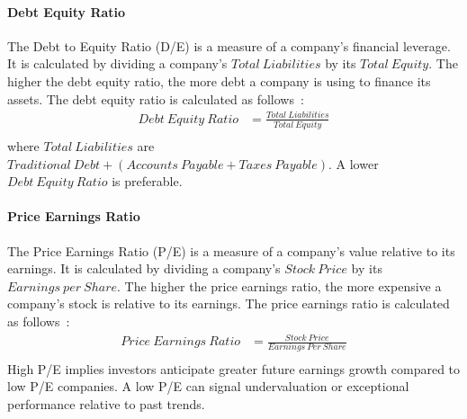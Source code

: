 \documentclass[../xlapes02]{subfiles}
\begin{document}
    \paragraph{Debt Equity Ratio}\label{par:debt-equity-ratio}
    The Debt to Equity Ratio (D/E) is a measure of a company's financial leverage. It is calculated by dividing a company's $Total\ Liabilities$ by its $Total\ Equity$. The higher the debt equity ratio, the more debt a company is using to finance its assets. The debt equity ratio is calculated as follows~\cite{investopedia}:
    \begin{equation}
        \begin{split}
            Debt\ Equity\ Ratio&=\frac{Total\ Liabilities}{Total\ Equity}\\
        \end{split}
    \end{equation}
    where $Total\ Liabilities$ are $Traditional\ Debt+(Accounts\ Payable+Taxes\ Payable)$. A lower $Debt\ Equity\ Ratio$ is preferable.

    \paragraph{Price Earnings Ratio}\label{par:price-earnings-ratio}
    The Price Earnings Ratio (P/E) is a measure of a company's value relative to its earnings. It is calculated by dividing a company's $Stock\ Price$ by its $Earnings\ per\ Share$. The higher the price earnings ratio, the more expensive a company's stock is relative to its earnings. The price earnings ratio is calculated as follows~\cite{investopedia}:
    \begin{equation}
        \begin{split}
            Price\ Earnings\ Ratio&=\frac{Stock\ Price}{Earnings\ Per\ Share}\\
        \end{split}
    \end{equation}
    High P/E implies investors anticipate greater future earnings growth compared to low P/E companies. A low P/E can signal undervaluation or exceptional performance relative to past trends.
\end{document}
